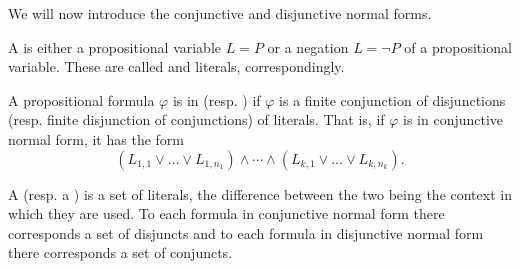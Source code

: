 \begin{definition}\label{def:conjunctive_disjunctive_normal_form}
  We will now introduce the conjunctive and disjunctive normal forms.

  \begin{thmenum}
     A  is either a propositional variable \( L = P \) or a negation \( L = \neg P \) of a propositional variable. These are called  and  literals, correspondingly.

     A propositional formula \( \varphi \) is in  (resp. ) if \( \varphi \) is a finite conjunction of disjunctions (resp. finite disjunction of conjunctions) of literals. That is, if \( \varphi \) is in conjunctive normal form, it has the form
    \begin{equation*}
      (L_{1,1} \vee \ldots \vee L_{1,n_1}) \wedge \cdots \wedge (L_{k,1} \vee \ldots \vee L_{k,n_k}).
    \end{equation*}

     A  (resp. a ) is a set of literals, the difference between the two being the context in which they are used. To each formula in conjunctive normal form there corresponds a set of disjuncts and to each formula in disjunctive normal form there corresponds a set of conjuncts.
  \end{thmenum}
\end{definition}

